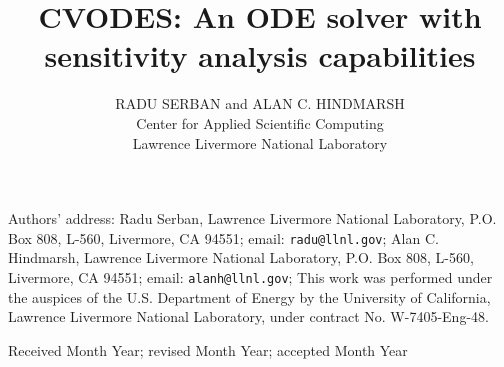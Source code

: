 \documentclass[acmtoms]{acmtrans2m}
\title{CVODES: An ODE solver with sensitivity analysis capabilities}
\author{RADU SERBAN and ALAN C. HINDMARSH \\
  Center for Applied Scientific Computing \\
  Lawrence Livermore National Laboratory}
\begin{document}
\setcounter{page}{1}

\begin{bottomstuff}
Authors' address: 
Radu Serban, 
Lawrence Livermore National Laboratory, P.O. Box 808, L-560,
Livermore, CA 94551; email: {\tt radu@llnl.gov};
Alan C. Hindmarsh,
Lawrence Livermore National Laboratory, P.O. Box 808, L-560,
Livermore, CA 94551; email: {\tt alanh@llnl.gov};
\newline
This work was performed under the auspices of the
U.S. Department of Energy by the University of California,
Lawrence Livermore National Laboratory, under contract No.
W-7405-Eng-48.
\end{bottomstuff}

\maketitle













\begin{received}
Received Month Year;
revised Month Year; accepted Month Year
\end{received}
\end{document}
